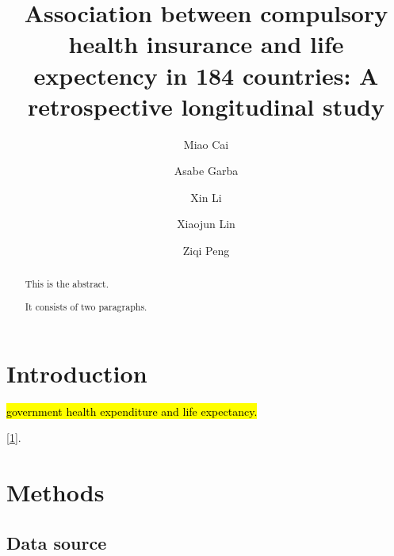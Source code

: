 \documentclass[]{elsarticle} %
\begin{document}
\begin{frontmatter}

  \title{Association between compulsory health insurance and life expectency in 184 countries: A retrospective longitudinal study}
    \author[SLU]{Miao Cai}
  
    \author[SLU]{Asabe Garba}
  
    \author[WHU]{Xin Li}
  
    \author[SCU]{Xiaojun Lin}
    \author[SLU]{Ziqi Peng}
  
      \address[SLU]{College for Public Health and Social Justice, Saint Louis University, Saint Louis, MO, 63108}
    \address[SCU]{West China School of Public Health, Sichuan University, Chengdu, Sichuan, China, 610044}
    \address[WHU]{School of Information Management, Wuhan University, Wuhan, Hubei, China, 430072}
  
  \begin{abstract}
  This is the abstract.
  
  It consists of two paragraphs.
  \end{abstract}
  
 \end{frontmatter}

\newcommand{\blandscape}{\begin{landscape}}
\newcommand{\elandscape}{\end{landscape}}
\doublespacing

\hypertarget{introduction}{%
\section{Introduction}\label{introduction}}

\hl{government health expenditure and life expectancy.}

{[}\protect\hyperlink{ref-wagstaff2018progress}{1}{]}.

\hypertarget{methods}{%
\section{Methods}\label{methods}}

\hypertarget{data-source}{%
\subsection{Data source}\label{data-source}}
\end{document}
